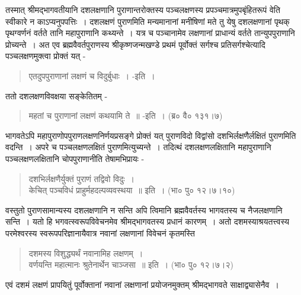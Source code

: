 {तस्मात् श्रीमद्भागवतीयानि दशलक्षणानि पुराणान्तरोक्तस्य पञ्चलक्षणस्य प्रपञ्चमात्रमुपबृंहितरूपं वेति स्वीकारे न काऽप्यनुपपत्तिः~। दशलक्षणं पुराणमिति मन्यमानानां मनीषिणां मते तु येषु दशलक्षणानां पृथक् पृथग्वर्णनं वर्तते तानि महापुराणानि कथ्यन्ते~। यत्र च पञ्चानामेव लक्षणानां प्राधान्यं वर्तते तान्युपपुराणानि प्रोच्यन्ते~। अत एव ब्रह्मवैवर्तपुराणस्य श्रीकृष्णजन्मखण्डे प्रथमं पूर्वोक्तं सर्गश्च प्रतिसर्गश्चेत्यादि पञ्चलक्षणमुक्त्वा प्रोक्तं यत् -
\begin{verse}
एतदुपपुराणानां लक्षणं च विदुर्बुधाः~। -इति~।
\end{verse}
ततो दशलक्षणविवक्षया सङ्केतितम् -
\begin{verse}
महतां च पुराणानां लक्षणं कथयामि ते~॥ -इति~। (ब्र० वै० १३१।७)
\end{verse}
भागवतेऽपि महापुराणोपपुराणलक्षणनिर्णयप्रसङ्गे प्रोक्तं यत् पुराणविदो विद्वांसो दशभिर्लक्षणैर्लक्षितं पुराणमिति वदन्ति~। अपरे च पञ्चलक्षणलक्षितं पुराणमित्युच्यन्ते~। तदित्थं दशलक्षणलक्षितानि महापुराणानि पञ्चलक्षणलक्षितानि चोपपुराणानीति तेषामभिप्रायः -
\begin{verse}
दशभिर्लक्षणैर्युक्तं पुराणं तद्विवो विदुः~।\\
केचित् पञ्चविधं प्राहुर्महदल्पव्यवस्थया~॥ इति~। (भा० पु० १२।७।१०)
\end{verse}
वस्तुतो पुराणसामान्यस्य दशलक्षणानि न सन्ति अपि त्विमानि ब्रह्मवैवर्तस्य भागवतस्य च नैजलक्षणानि सन्ति~। यतो हि भगवत्स्वरूपविवेचनमेव श्रीमद्भागवतस्य प्रधानं कारणम्~। अतो दशमस्याश्रयतत्त्वस्य परमेश्वरस्य स्वरूपपरिज्ञानायैवात्र नवानां लक्षणानां विवेचनं कृतमस्ति 
\begin{verse}
दशमस्य विशुद्ध्यर्थं नवानामिह लक्षणम्~।\\
वर्णयन्ति महात्मानः श्रुतेनार्थेन चाञ्जसा~॥ इति~। (भा० पु० १२।७।२)
\end{verse}
एवं दशमं लक्षणं प्रापयितुं पूर्वोक्तानां नवानां लक्षणानां प्रयोजनमुक्तम् श्रीमद्भागवते साक्षाद्व्यासेनैव~।

\articleend
}

